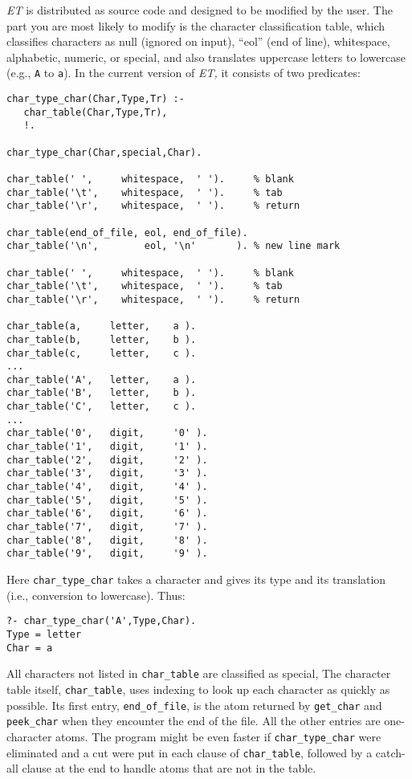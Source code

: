 \documentclass[12pt]{article}
\begin{document}
\emph{ET} is distributed as source code and designed to be modified by the user.
The part you are most likely to modify is the character classification table,
which classifies characters as null (ignored on input), ``eol'' (end of line),
whitespace, alphabetic, numeric, or special,
and also translates uppercase letters to lowercase (e.g., \verb"A" to \verb"a").
In the current version of \emph{ET,} it consists of two predicates:
\begin{verbatim}
char_type_char(Char,Type,Tr) :-
   char_table(Char,Type,Tr),
   !.

char_type_char(Char,special,Char).

char_table(' ',     whitespace,  ' ').     % blank
char_table('\t',    whitespace,  ' ').     % tab
char_table('\r',    whitespace,  ' ').     % return

char_table(end_of_file, eol, end_of_file).
char_table('\n',        eol, '\n'       ). % new line mark

char_table(' ',     whitespace,  ' ').     % blank
char_table('\t',    whitespace,  ' ').     % tab
char_table('\r',    whitespace,  ' ').     % return

char_table(a,     letter,    a ).
char_table(b,     letter,    b ).
char_table(c,     letter,    c ).
...
char_table('A',   letter,    a ).
char_table('B',   letter,    b ).
char_table('C',   letter,    c ).
...
char_table('0',   digit,     '0' ).
char_table('1',   digit,     '1' ).
char_table('2',   digit,     '2' ).
char_table('3',   digit,     '3' ).
char_table('4',   digit,     '4' ).
char_table('5',   digit,     '5' ).
char_table('6',   digit,     '6' ).
char_table('7',   digit,     '7' ).
char_table('8',   digit,     '8' ).
char_table('9',   digit,     '9' ).
\end{verbatim}
Here \verb"char_type_char" takes a character and gives its type and its
translation (i.e., conversion to lowercase).  Thus:
\begin{verbatim}
?- char_type_char('A',Type,Char).
Type = letter
Char = a
\end{verbatim}
All characters not listed in \verb"char_table" are classified as special,
The character table itself, \verb"char_table",
uses indexing to look up each character as quickly as
possible.
Its first entry, \verb"end_of_file",
is the atom returned by \verb"get_char" and \verb"peek_char" when
they encounter the end of the file.
All the other entries are one-character atoms.
The program might be even faster if \verb"char_type_char" were eliminated
and a cut were put in each clause of \verb"char_table", followed by
a catch-all clause at the end to handle atoms that are not in the table.
\end{document}
